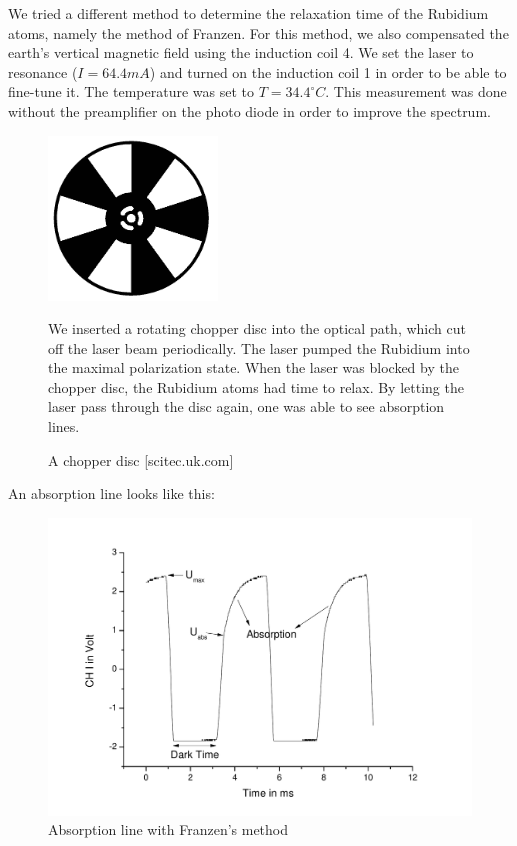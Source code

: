 We tried a different method to determine the relaxation time of the Rubidium atoms, namely the method of Franzen. For this method, we also compensated the earth's vertical magnetic field using the induction coil 4. We set the laser to resonance ($I=64.4 mA$) and turned on the induction coil 1 in order to be able to fine-tune it. The temperature was set to $T=34.4^\circ C$. This measurement was done without the preamplifier on the photo diode in order to improve the spectrum.\\

\begin{figure}[H]
\begin{minipage}{0.5\textwidth}
\centering \includegraphics[width=0.4\textwidth]{BilderAusw/chopper.png}
\caption{A chopper disc [scitec.uk.com]}
\end{minipage}
\begin{minipage}{0.5\textwidth}
We inserted a rotating chopper disc into the optical path, which cut off the laser beam periodically. The laser pumped the Rubidium into the maximal polarization state. When the laser was blocked by the chopper disc, the Rubidium atoms had time to relax. By letting the laser pass through the disc again, one was able to see absorption lines.\\

\end{minipage}
\end{figure}

An absorption line looks like this:

\begin{figure}[H]
\centering \includegraphics[width=\textwidth]{BilderAusw/FranzenBsp.pdf}
\caption{Absorption line with Franzen's method}
\end{figure}

